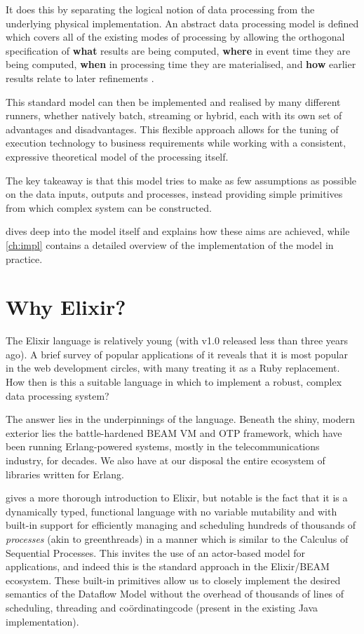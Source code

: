 It does this by separating the logical notion of data processing from the underlying physical implementation.
An abstract data processing model is defined which covers all of the existing modes of processing by allowing the orthogonal specification of \textbf{what} results are being computed, \textbf{where} in event time they are being computed, \textbf{when} in processing time they are materialised, and \textbf{how} earlier results relate to later refinements \cite[p. 1793]{Akidau:2015}.

This standard model can then be implemented and realised by many different runners, whether natively batch, streaming or hybrid, each with its own set of advantages and disadvantages. 
This flexible approach allows for the tuning of execution technology to business requirements while working with a consistent, expressive theoretical model of the processing itself.

The key takeaway is that this model tries to make as few assumptions as possible on the data inputs, outputs and processes, instead providing simple primitives from which complex system can be constructed.

 dives deep into the model itself and explains how these aims are achieved, while \cref{ch:impl} contains a detailed overview of the implementation of the model in practice.

\section{Why Elixir?}\label{sec:intro:elixir}

The Elixir language \cite{Elixir} is relatively young (with v1.0 released less than three years ago).
A brief survey of popular applications of it reveals that it is most popular in the web development circles, with many treating it as a Ruby replacement.
How then is this a suitable language in which to implement a robust, complex data processing system?

The answer lies in the underpinnings of the language.
Beneath the shiny, modern exterior lies the battle-hardened BEAM VM and OTP framework, which have been running Erlang-powered systems, mostly in the telecommunications industry, for decades.
We also have at our disposal the entire ecosystem of libraries written for Erlang.

 gives a more thorough introduction to Elixir, but notable is the fact that it is a dynamically typed, functional language with no variable mutability and with built-in support for efficiently managing and scheduling hundreds of thousands of \emph{processes} (akin to greenthreads) in a manner which is similar to the Calculus of Sequential Processes.
This invites the use of an actor-based model for applications, and indeed this is the standard approach in the Elixir/BEAM ecosystem.
These built-in primitives allow us to closely implement the desired semantics of the Dataflow Model without the overhead of thousands of lines of scheduling, threading and co\"ordinating\footnotemark[1] code (present in the existing Java implementation).

